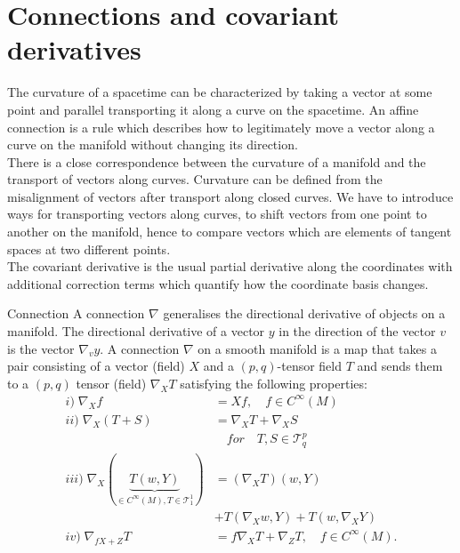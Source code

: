 \section{Connections and covariant derivatives}
The curvature of a spacetime can be characterized by taking a vector at some point and parallel transporting it along a curve on the spacetime. An affine connection is a rule which describes how to legitimately move a vector along a curve on the manifold without changing its direction.\\
There is a close correspondence between the curvature of a manifold and the transport of vectors along curves. Curvature can be defined from the misalignment of vectors after transport along closed curves. We have to introduce ways for transporting vectors along curves, to shift vectors from one point to another on the manifold, hence to compare vectors which are elements of tangent spaces at two different points.\\
The covariant derivative is the usual partial derivative along the coordinates with additional
correction terms which quantify how the coordinate basis changes.
\begin{mybox}{Connection}
	A connection $\nabla$ generalises the directional derivative of objects on a manifold. The directional derivative of a vector $y$ in the direction of the vector $v$ is the vector $\nabla_v y$. A connection $\nabla$ on a smooth manifold is a map that takes a pair consisting of a vector (field) $X$ and a $(p,q)$-tensor field $T$ and sends them to a $(p,q)$ tensor (field) $\nabla_X T$ satisfying the following properties:
	\begin{align}
	i)\;	\nabla_X f &= X f, \quad f\in C^{\infty}(M) \\
	ii)\;	\nabla_X(T+S) &= \nabla_X T + \nabla_X S \\
		&\quad for \quad T,S \in \mathcal{T}^p_q \nonumber \\
	iii)\;	 \nabla_X (\underbrace{T(w,Y)}_{\in C^{\infty}(M),  T\in \mathcal{T}^1_1}) &= (\nabla_X T)(w,Y) \nonumber \\
		&+ T(\nabla_Xw,Y) + T(w,\nabla_XY)\\
	iv)\;	\nabla_{f X+Z} T &= f \nabla_X T + \nabla_Z T, \quad f \in C^{\infty}(M).
		\end{align}
\end{mybox}

